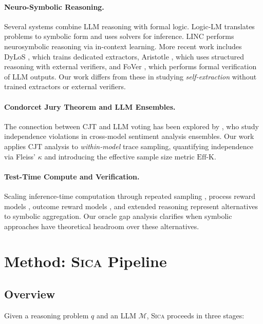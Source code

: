 \documentclass[11pt,a4paper]{article}
\newcommand{\sica}{\textsc{Sica}}
\newcommand{\effk}{\text{Eff-K}}
\begin{document}
\paragraph{Neuro-Symbolic Reasoning.}
Several systems combine LLM reasoning with formal logic.
Logic-LM \citep{pan2023logiclm} translates problems to symbolic form and uses solvers for inference.
LINC \citep{olausson2023linc} performs neurosymbolic reasoning via in-context learning.
More recent work includes DyLoS \citep{dylos2026}, which trains dedicated extractors, Aristotle \citep{aristotle2025}, which uses structured reasoning with external verifiers, and FoVer \citep{fover2025}, which performs formal verification of LLM outputs.
Our work differs from these in studying \emph{self-extraction} without trained extractors or external verifiers.

\paragraph{Condorcet Jury Theorem and LLM Ensembles.}
The connection between CJT and LLM voting has been explored by \citet{li2024independence}, who study independence violations in cross-model sentiment analysis ensembles.
Our work applies CJT analysis to \emph{within-model} trace sampling, quantifying independence via Fleiss' $\kappa$ \citep{fleiss1971} and introducing the effective sample size metric $\effk{}$.

\paragraph{Test-Time Compute and Verification.}
Scaling inference-time computation through repeated sampling \citep{snell2025scaling}, process reward models \citep{lightman2023prm}, outcome reward models \citep{cobbe2021orm}, and extended reasoning \citep{deepseekr1} represent alternatives to symbolic aggregation.
Our oracle gap analysis clarifies when symbolic approaches have theoretical headroom over these alternatives.

\section{Method: \sica{} Pipeline}

\subsection{Overview}

Given a reasoning problem $q$ and an LLM $\mathcal{M}$, \sica{} proceeds in three stages:
\end{document}
